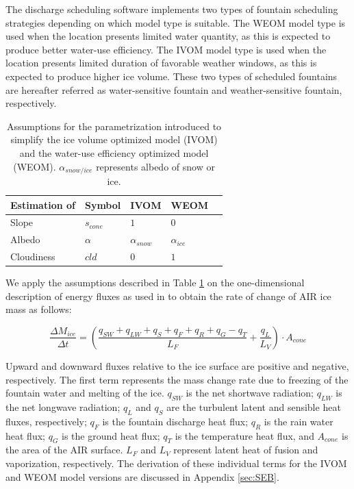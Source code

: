 \documentclass[tc, manuscript]{copernicus}
\begin{document}
The discharge scheduling software implements two types of fountain scheduling strategies depending on which
model type is suitable. The WEOM model type is used when the location presents limited water quantity, as this is expected to
produce better water-use efficiency. The IVOM model type is used when the location presents limited duration of favorable
weather windows, as this is expected to produce higher ice volume. These two types of scheduled fountains are hereafter referred as water-sensitive fountain and weather-sensitive fountain, respectively.

\begin{table}[htb]
\centering
\caption{Assumptions for the parametrization introduced to simplify the ice volume optimized model (IVOM) and the
water-use efficiency optimized model (WEOM). $\alpha_{snow/ice}$ represents albedo of snow or ice.}
\label{tab:assumptions}
\begin{tabular}{@{}lllll@{}}
\toprule
\textbf{Estimation of} & \textbf{Symbol} & \textbf{IVOM} & \textbf{WEOM} & \\ \midrule
\multicolumn{1}{|l}{Slope}        & $s_{cone}$ & $ 1 $ & $0$ & \multicolumn{1}{l|}{} \\ \midrule
\multicolumn{1}{|l}{Albedo} & $\alpha$ & $\alpha_{snow}$ & $\alpha_{ice}$ & \multicolumn{1}{l|}{} \\\midrule 
\multicolumn{1}{|l}{Cloudiness}  & $cld$ & $0$ & $1$ & \multicolumn{1}{l|}{} \\ \bottomrule
\end{tabular}
\end{table}

We apply the assumptions described in Table \ref{tab:assumptions} on the one-dimensional description of energy
fluxes as used in \cite{balasubramanianInfluenceMeteorologicalConditions2022} to obtain the rate of change of
AIR ice mass as follows: 

\begin{equation}
  \frac{\Delta M_{ice}}{\Delta t}  =  (\frac{q_{SW} + q_{LW} + q_{S} + q_{F} + q_{R} + q_{G} - q_{T}}{L_F} + \frac{q_{L}}{L_V} ) \cdot A_{cone}
	\label{eqn:auto}
\end{equation}

Upward and downward fluxes relative to the ice surface are positive and negative, respectively. The first term
represents the mass change rate due to freezing of the fountain water and melting of the ice. $q_{SW}$ is the
net shortwave radiation; $q_{LW}$ is the net longwave radiation; $q_{L}$ and $q_{S}$ are the turbulent latent
and sensible heat fluxes, respectively; $q_{F}$ is the fountain discharge heat flux; $q_{R}$ is the rain water heat flux;
$q_{G}$ is the ground heat flux; $q_{T}$ is the temperature heat flux, and $A_{cone}$ is the area of the AIR
surface. $L_F$ and $L_{V}$ represent latent heat of fusion and vaporization, respectively. The derivation of
these individual terms for the IVOM and WEOM model versions are discussed in Appendix \ref{sec:SEB}.
\end{document}
